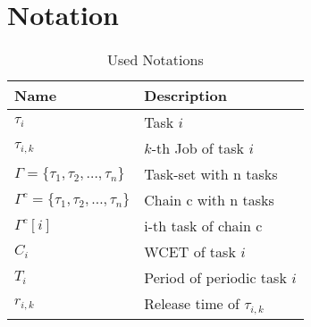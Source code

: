 \chapter{Notation}\label{ch:notation}
\begin{table}[h!]
\centering
\begin{tabular}{ll}
\textbf{Name} & \textbf{Description} \\
\hline
$\tau_i$ & Task $i$ \\
$\tau_{i,k}$ & $k$-th Job of task $i$ \\
$\Gamma = \{\tau_1, \tau_2, \ldots, \tau_n\}$ & Task-set with n tasks \\
$\Gamma^c = \{\tau_1, \tau_2, \ldots, \tau_n\}$ & Chain c with n tasks \\
$\Gamma^c[i]$ & i-th task of chain c \\ 
$C_i$ & \ac{WCET} of task $i$ \\
$T_i$ & Period of periodic task $i$ \\
$r_{i,k}$ & Release time of $\tau_{i,k}$ \\
\end{tabular}
\caption{Used Notations}\label{tab:notation}
\end{table}